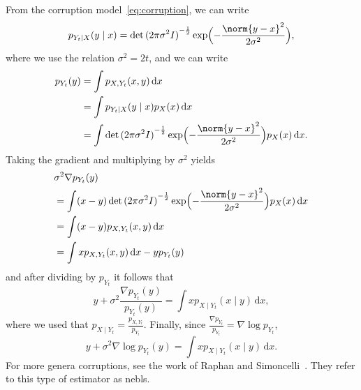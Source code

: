 From the corruption model~\eqref{eq:corruption}, we can write
\begin{equation}
	p_{Y_t \mid X}(y \mid x) = \Determinant{(\num{2}\pi\sigma^{\num{2}}\Identity)}^{-\frac{1}{2}} \exp\Bigl( -\frac{\norm{y - x}^{\num{2}}}{\num{2}\sigma^{\num{2}}} \Bigr),
\end{equation}
where we use the relation \( \sigma^{\num{2}} = \num{2}t \), and we can write
\begin{equation}
	\begin{aligned}
		p_{Y_t}(y) &= \int p_{X, Y_t}(x, y)\,\mathrm{d}x \\
				   &= \int p_{Y_t\mid X}(y\mid x) p_{X}(x)\,\mathrm{d}x \\
				   &= \int \Determinant{(\num{2}\pi\sigma^{\num{2}}\Identity)}^{-\frac{1}{2}} \exp\Bigl( -\frac{\norm{y - x}^{\num{2}}}{\num{2}\sigma^{\num{2}}} \Bigr) p_{X}(x)\,\mathrm{d}x.
	\end{aligned}
	\label{eq:py}
\end{equation}
Taking the gradient and multiplying by \( \sigma^{\num{2}} \) yields
\begin{equation}
	\begin{aligned}
		&\sigma^{\num{2}} \nabla p_{Y_t}(y) \\
		&= \int (x - y)\Determinant{(\num{2}\pi\sigma^{\num{2}}\Identity)}^{-\frac{1}{2}} \exp\Bigl( -\frac{\norm{y - x}^{\num{2}}}{\num{2}\sigma^{\num{2}}} \Bigr) p_{X}(x)\,\mathrm{d}x \\
		&= \int (x - y) p_{X, Y_t}(x, y)\,\mathrm{d}x\\
		&= \int x p_{X, Y_t}(x, y)\,\mathrm{d}x - yp_{Y_t}(y)
	\end{aligned}
\end{equation}
and after dividing by \( p_{Y_t} \) it follows that
\begin{equation}
	y + \sigma^{\num{2}} \frac{\nabla p_{Y_t}(y)}{p_{Y_t}(y)} = \int xp_{X\mid Y_t}(x\mid y)\,\mathrm{d}x,
\end{equation}
where we used that \( p_{X \mid Y_t} = \frac{p_{X, Y_t}}{p_{Y_t}} \).
Finally, since \( \frac{\nabla p_{Y_t}}{p_{Y_t}} = \nabla \log p_{Y_t} \),
\begin{equation}
	y + \sigma^{\num{2}} \nabla \log p_{Y_t}(y) = \int xp_{X\mid Y_t}(x\mid y)\,\mathrm{d}x.
	\label{eq:tweedie}
\end{equation}
For more genera corruptions, see the work of Raphan and Simoncelli~\cite{raphan_least_2011}.
They refer to this type of estimator as \gls{nebls}.

